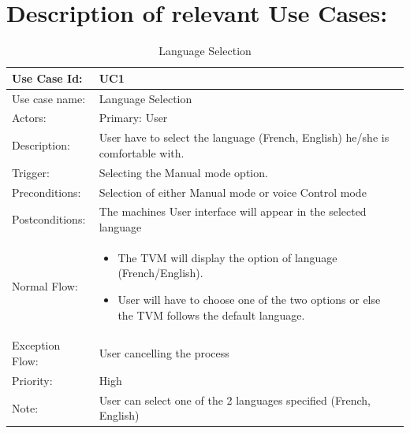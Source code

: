 \documentclass[11pt,oneside]{book}
\begin{document}
\section{Description of relevant Use Cases:}
\begin{table}[h]
\centering
\begin{tabular}{|p{2.4cm}|p{11cm}|}
\hline
{Use Case Id: } & {UC1} \\
\hline
{Use case name:} & {Language Selection}\\
\hline
{Actors: } & {Primary: User}\\
\hline
{Description:} & {User have to select the language (French, English) he/she is comfortable with. }\\
\hline

{Trigger:  } & {Selecting the Manual mode option.}\\
\hline
{Preconditions:  } & {Selection of either Manual mode or voice Control mode}\\
\hline
{Postconditions:} & {The machines User interface will appear in the selected language}\\
\hline
{Normal Flow: } & {
\begin{itemize}
\item	The TVM will display the option of language (French/English).
\item	User will have to choose one of the two options or else the TVM follows the default language.

\end{itemize}
}\\
\hline
{Exception Flow: } & {User cancelling the process}\\
\hline
{Priority:  } & {High}\\
\hline
{Note:  } & {User can select one of the 2 languages specified (French, English)}\\
\hline
\end{tabular}
\caption{Language Selection}
\end{table}
\end{document}
